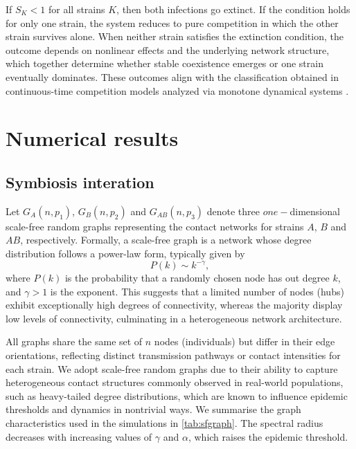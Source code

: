 \documentclass[a4paper,12pt]{scrartcl}
\theoremstyle{plain}%
\theoremstyle{definition}
\theoremstyle{remark}
\numberwithin{equation}{section}
\begin{document}
If $S_K < 1$ for all strains $K$, then both infections go extinct. If the condition holds for only one strain, the system reduces to pure competition in which the other strain survives alone. When neither strain satisfies the extinction condition, the outcome depends on nonlinear effects and the underlying network structure, which together determine whether stable coexistence emerges or one strain eventually dominates. These outcomes align with the classification obtained in continuous-time competition models analyzed via monotone dynamical systems \cite{doshi2021competing}.  


\section{Numerical results}
\subsection{Symbiosis interation}
Let \( G_A(n, p_1) \), \( G_B(n, p_2) \) and $G_{AB}(n, p_3)$ denote three $one-$dimensional scale-free random graphs representing the contact networks for strains \( A \), \( B \) and $AB$, respectively. Formally, a scale-free graph is a network whose degree distribution follows a power-law form, typically given by
\begin{equation}
    P(k) \sim k^{-\gamma}, %
\end{equation}
where \( P(k) \) is the probability that a randomly chosen node has out degree \( k \), and \( \gamma > 1 \) is the exponent. This suggests that a limited number of nodes (hubs) exhibit exceptionally high degrees of connectivity, whereas the majority display low levels of connectivity, culminating in a heterogeneous network architecture. 

All graphs share the same set of \( n \) nodes (individuals) but differ in their edge orientations, reflecting distinct transmission pathways or contact intensities for each strain. We adopt scale-free random graphs due to their ability to capture heterogeneous contact structures commonly observed in real-world populations, such as heavy-tailed degree distributions, which are known to influence epidemic thresholds and dynamics in nontrivial ways. We summarise the graph characteristics used in the simulations in \autoref{tab:sfgraph}. The spectral radius decreases with increasing values of $\gamma$ and $\alpha$, which raises the epidemic threshold.
\end{document}
